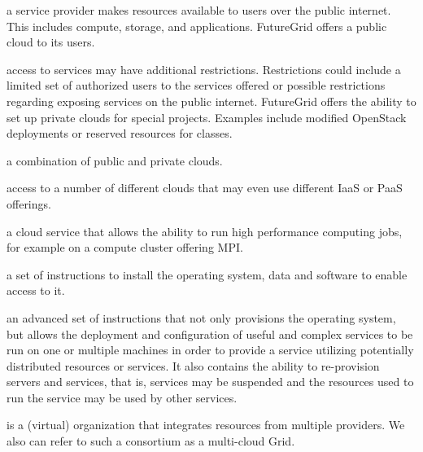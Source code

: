 \documentclass{tex/sig-alternate-2013}
\begin{document}
\begin{description}[leftmargin=*,itemsep=0pt,topsep=0pt]

\item[Public cloud:]  a service provider makes resources available to users over the public internet. This includes compute, storage, and applications. FutureGrid offers a public cloud to its users. 

\item[Private cloud:] access to services may have additional restrictions. Restrictions could include a limited set of authorized users to the services offered or possible restrictions regarding exposing services on the public internet. FutureGrid offers the ability to set up private clouds for special projects. Examples include modified OpenStack deployments or reserved resources for classes.

\item[Hybrid cloud:] a combination of public and private clouds. 

\item[Multi-cloud:] access to a number of different clouds that may even use different IaaS or PaaS offerings. 

\item[HPC service:] a cloud service that allows the ability to run high performance computing jobs, for example on a compute cluster offering MPI. 

\item[Provisioning:] a set of instructions to install the operating system, data and software to enable access to it. 

\item[Rain:] an advanced set of instructions that not only provisions the operating system, but allows the deployment and configuration of useful and complex services to be run on one or multiple machines in order to provide a service utilizing potentially distributed resources or services.  It also contains the ability to re-provision servers and services, that is, services may be suspended and the resources used to run the service may be used by other services.

\item[Provider consortium:] is a (virtual) organization that integrates resources from multiple providers. We also can refer to such a consortium as a multi-cloud Grid.

\end{description}


\end{document}
